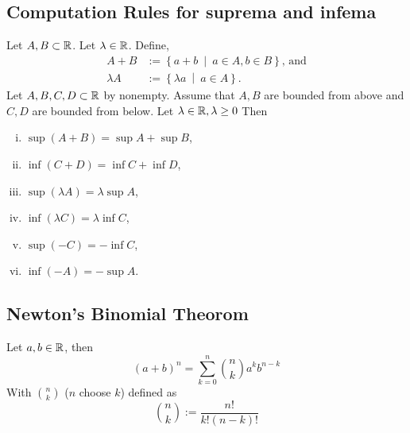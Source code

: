 \subsection{Computation Rules for suprema and infema}
Let $A, B \subset \mathbb{R}$. Let $\lambda \in \mathbb{R}$. Define,
\begin{align*}
    A + B &:= \left\{ a + b\ \middle|\ a \in A, b \in B \right\}\text{, and}\\
    \lambda A &:= \left\{ \lambda a\ \middle|\ a \in A \right\}.
\end{align*}
\uprop Let $A,B,C,D \subset \mathbb{R}$ by nonempty. Assume that $A,B$ are bounded from
above and $C,D$ are bounded from below. Let $\lambda \in \mathbb{R}, \lambda \geq 0$ Then
\begin{enumerate}[(i)]
    \item $\sup(A + B) = \sup A + \sup B$,
    \item $\inf(C + D) = \inf C + \inf D$,
    \item $\sup(\lambda A) = \lambda \sup A$,
    \item $\inf(\lambda C) = \lambda \inf C$,
    \item $\sup(-C) = - \inf C$,
    \item $\inf(-A) = - \sup A$.
\end{enumerate}


\subsection{Newton's Binomial Theorom}
\uthm Let $a, b \in \mathbb{R}$, then
\[
    (a+b)^n = \sum_{k = 0}^{n} \binom{n}{k} a^k b^{n-k}
\]
With $\binom{n}{k}$ ($n$ choose $k$) defined as
\[
    \binom{n}{k} := \frac{n!}{k!(n-k)!}
\]